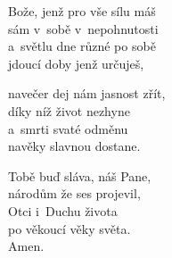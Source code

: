 \begin{translatioMulticol}{3}
Bože, jenž pro vše sílu máš\\
sám v~sobě v~nepohnutosti\\
a~světlu dne různé po sobě\\
jdoucí doby jenž určuješ,\columnbreak

navečer dej nám jasnost zřít,\\
díky níž život nezhyne\\
a~smrti svaté odměnu\\
navěky slavnou dostane.\columnbreak

Tobě buď sláva, náš Pane,\\
národům že ses projevil,\\
Otci i~Duchu života\\
po věkoucí věky světa.\\
Amen.
\end{translatioMulticol}
